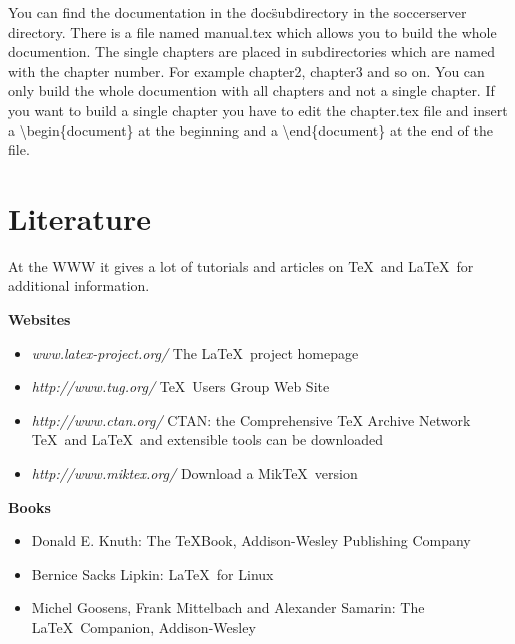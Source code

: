 You can find the documentation in the \"doc\" subdirectory in the soccerserver directory. There is a file named manual.tex which allows you to build the whole documention. The single chapters are placed in subdirectories which are named with the chapter number. For example chapter2, chapter3 and so on. You can only build the whole documention with all chapters and not a single chapter. If you want to build a single chapter you have to edit the chapter.tex file and insert a \textbackslash begin\{document\} at the beginning and a \textbackslash end\{document\} at the end of the file.\\



\section{Literature}

At the WWW it gives a lot of tutorials and articles on \TeX\ and
\LaTeX\ for additional information.

\smallskip

\textbf{Websites}
\begin{itemize}
\item \textit{www.latex-project.org/} \hspace{10pt} The \LaTeX\
project homepage

\item \textit{http://www.tug.org/} \hspace{10pt} \TeX\ Users Group
Web Site

\item \textit{http://www.ctan.org/} \hspace{10pt} CTAN: the
Comprehensive TeX Archive Network \TeX\ and \LaTeX\ and extensible
tools can be downloaded

\item \textit{http://www.miktex.org/} \hspace{10pt} Download a
Mik\TeX\ version

\end{itemize}

\smallskip


\textbf{Books}
\begin{itemize}

\item Donald E. Knuth: The \TeX Book,  Addison-Wesley Publishing
Company

\item Bernice Sacks Lipkin: \LaTeX\ for Linux

\item Michel Goosens, Frank Mittelbach and Alexander Samarin: The
\LaTeX\ Companion, Addison-Wesley

\end{itemize}

